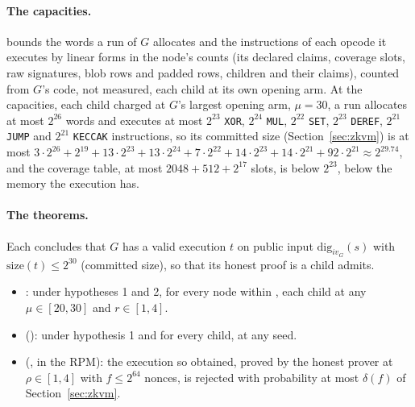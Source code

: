 \documentclass[11pt]{article}
\begin{document}
\paragraph{The capacities.}  bounds the words a run of $G$ allocates and the instructions of each opcode it executes by linear forms in the node's counts (its declared claims, coverage slots, raw signatures, blob rows and padded rows, children and their claims), counted from $G$'s code, not measured, each child at its own opening arm. At the capacities, each child charged at $G$'s largest opening arm, $\mu = 30$, a run allocates at most $2^{26}$ words and executes at most $2^{23}$ \texttt{XOR}, $2^{24}$ \texttt{MUL}, $2^{22}$ \texttt{SET}, $2^{23}$ \texttt{DEREF}, $2^{21}$ \texttt{JUMP} and $2^{21}$ \texttt{KECCAK} instructions, so its committed size (Section~\ref{sec:zkvm}) is at most $3 \cdot 2^{26} + 2^{19} + 13 \cdot 2^{23} + 13 \cdot 2^{24} + 7 \cdot 2^{22} + 14 \cdot 2^{23} + 14 \cdot 2^{21} + 92 \cdot 2^{21} \approx 2^{29.74}$, and the coverage table, at most $2048 + 512 + 2^{17}$ slots, is below $2^{23}$, below the memory the execution has.

\paragraph{The theorems.} Each concludes that $G$ has a valid execution $t$ on public input
$\mathrm{dig}_{iv_G}(s)$ with $\mathrm{size}(t) \le 2^{30}$ (committed size), so that its honest
proof is a child  admits.
\begin{itemize}
\item {}: under hypotheses 1 and 2, for every node within , each child at any $\mu \in [20,30]$ and $r \in [1,4]$.
\item {} (): under hypothesis 1 and  for every child, at any seed.
\item {} (, in the RPM): the execution so obtained,
proved by the honest prover at $\rho \in [1,4]$ with $f \le 2^{64}$ nonces, is rejected with
probability at most $\delta(f)$ of Section~\ref{sec:zkvm}.
\end{itemize}
\end{document}
